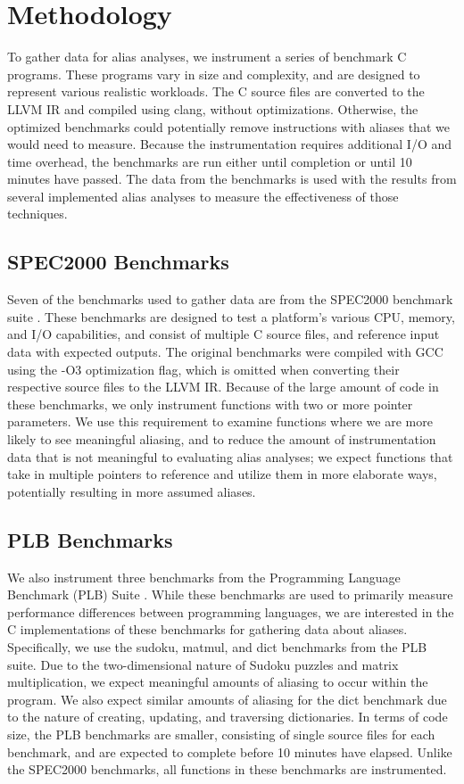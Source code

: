 \chapter{Methodology}

To gather data for alias analyses, we instrument a series of benchmark C programs. These programs vary in size and complexity, and are designed to represent various realistic workloads. The C source files are converted to the LLVM IR and compiled using clang, without optimizations. Otherwise, the optimized benchmarks could potentially remove instructions with aliases that we would need to measure. Because the instrumentation requires additional I/O and time overhead, the benchmarks are run either until completion or until 10 minutes have passed. The data from the benchmarks is used with the results from several implemented alias analyses to measure the effectiveness of those techniques.

\section{SPEC2000 Benchmarks}
Seven of the benchmarks used to gather data are from the SPEC2000 benchmark suite \cite{spec2000}. These benchmarks are designed to test a platform's various CPU, memory, and I/O capabilities, and consist of multiple C source files, and reference input data with expected outputs. The original benchmarks were compiled with GCC using the -O3 optimization flag, which is omitted when converting their respective source files to the LLVM IR. Because of the large amount of code in these benchmarks, we only instrument functions with two or more pointer parameters. We use this requirement to examine functions where we are more likely to see meaningful aliasing, and to reduce the amount of instrumentation data that is not meaningful to evaluating alias analyses; we expect functions that take in multiple pointers to reference and utilize them in more elaborate ways, potentially resulting in more assumed aliases.

\section{PLB Benchmarks}
We also instrument three benchmarks from the Programming Language Benchmark (PLB) Suite \cite{plb}. While these benchmarks are used to primarily measure performance differences between programming languages, we are interested in the C implementations of these benchmarks for gathering data about aliases. Specifically, we use the sudoku, matmul, and dict benchmarks from the PLB suite. Due to the two-dimensional nature of Sudoku puzzles and matrix multiplication, we expect meaningful amounts of aliasing to occur within the program. We also expect similar amounts of aliasing for the dict benchmark due to the nature of creating, updating, and traversing dictionaries. In terms of code size, the PLB benchmarks are smaller, consisting of single source files for each benchmark, and are expected to complete before 10 minutes have elapsed. Unlike the SPEC2000 benchmarks, all functions in these benchmarks are instrumented.

